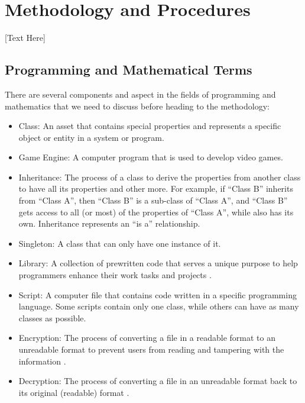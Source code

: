 
\section{Methodology and Procedures}

[Text Here]

\subsection{Programming and Mathematical Terms}
There are several components and aspect in the fields of programming and mathematics that we need to discuss before heading to the methodology:
\begin{itemize}
    \item {Class: An asset that contains special properties and represents a specific object or entity in a system or program.}
    
    \item{Game Engine: A computer program that is used to develop video games.}
    
    \item{Inheritance: The process of a class to derive the properties from another class to have all its properties and other more. For example, if “Class B” inherits from “Class A”, then “Class B” is a sub-class of “Class A”, and “Class B” gets access to all (or most) of the properties of “Class A”, while also has its own. Inheritance represents an “is a” relationship.}
    
    \item{Singleton: A class that can only have one instance of it.}
    
    \item{Library: A collection of prewritten code that serves a unique purpose to help programmers enhance their work tasks and projects \cite{LibraryDef}.}
    
    \item{Script: A computer file that contains code written in a specific programming language. Some scripts contain only one class, while others can have as many classes as possible.}
    
    \item{Encryption: The process of converting a file in a readable format to an unreadable format to prevent users from reading and tampering with the information \cite{EncryptionAndDecryption}.}
    
    \item{Decryption: The process of converting a file in an unreadable format back to its original (readable) format \cite{EncryptionAndDecryption}.}
    

\end{itemize}
